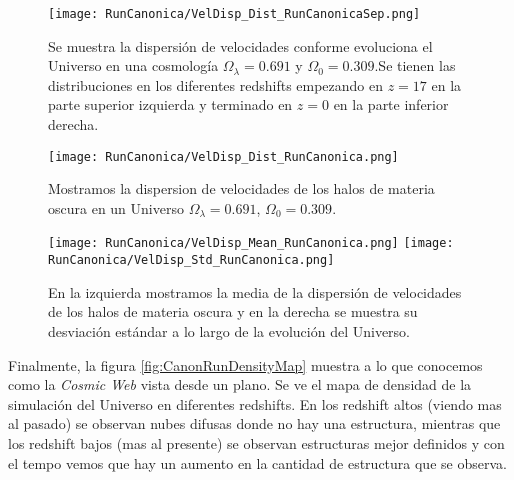 
\begin{figure}[H]
    \centering
    \texttt{[image: RunCanonica/VelDisp\_Dist\_RunCanonicaSep.png]}
    \caption[Dispersión de velocidades]{\footnotesize Se muestra la dispersión de velocidades conforme evoluciona el Universo en una cosmología $\Omega_\lambda = 0.691 $ y $\Omega_0 = 0.309$.Se tienen las distribuciones en los diferentes redshifts empezando en $z=17$ en la parte superior izquierda y terminado en $z=0$ en la parte inferior derecha.}
    \label{fig:Canon-VelDispDistSep}
\end{figure}

\begin{figure}[H]
    \centering
    \texttt{[image: RunCanonica/VelDisp\_Dist\_RunCanonica.png]}
    \caption[Distribución de la dispersión de velocidades]{\footnotesize Mostramos la dispersion de velocidades de los halos de materia oscura en un Universo $\Omega_\lambda = 0.691 $, $\Omega_0 = 0.309$.}
    \label{fig:Canon-VelDispDist}
\end{figure}

\begin{figure}[H]
    \centering
    \texttt{[image: RunCanonica/VelDisp\_Mean\_RunCanonica.png]}
    \texttt{[image: RunCanonica/VelDisp\_Std\_RunCanonica.png]}
    \caption[Media y desviación estándar de la dispersión de velocidades]{\footnotesize En la izquierda mostramos la media de la dispersión de velocidades de los halos de materia oscura y en la derecha se muestra su desviación estándar a lo largo de la evolución del Universo.}
    \label{fig:Canon-VelDispStats}
\end{figure}

Finalmente, la figura \ref{fig:CanonRunDensityMap} muestra a lo que conocemos como la \emph{Cosmic Web} vista desde un plano. Se ve el mapa de densidad de la simulación del Universo en diferentes redshifts. En los redshift altos (viendo mas al pasado) se observan nubes difusas donde no hay una estructura, mientras que los redshift bajos (mas al presente) se observan estructuras mejor definidos y con el tempo vemos que hay un aumento en la cantidad de estructura que se observa.

